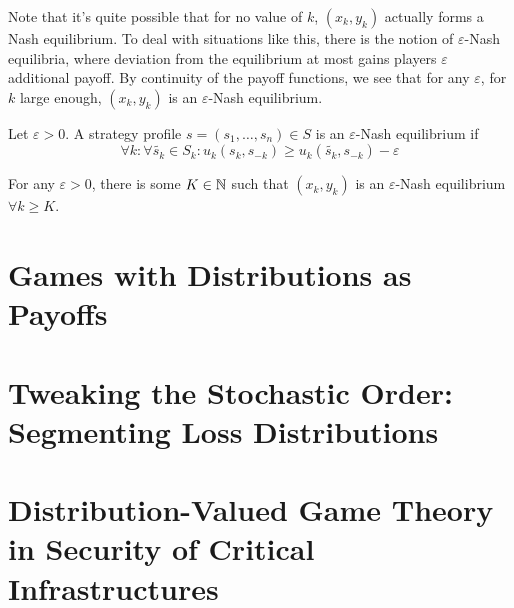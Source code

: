 \documentclass[a4paper]{scrreprt}
\let\epsilon\varepsilon
\begin{document}
    Note that it's quite possible that for no value of $k$, $(x_k, y_k)$ actually forms a Nash equilibrium.
    To deal with situations like this, there is the notion of $\epsilon$-Nash equilibria, where deviation from the equilibrium at most gains players $\epsilon$ additional payoff. %
    By continuity of the payoff functions, we see that for any $\epsilon$, for $k$ large enough, $(x_k, y_k)$ is an $\epsilon$-Nash equilibrium.
    
    \begin{defn}
        Let $\epsilon > 0$.
        A strategy profile $s = (s_1, \dots, s_n) \in S$ is an $\epsilon$-Nash equilibrium if
        \[
            \forall k: \forall \tilde{s_k} \in S_k: u_k(s_k, s_{-k}) \geq u_k(\tilde{s_k}, s_{-k}) - \epsilon
        \]
    \end{defn}

    \begin{cor}
        For any $\epsilon > 0$, there is some $K \in \mathbb{N}$ such that $(x_k, y_k)$ is an $\epsilon$-Nash equilibrium $\forall k \geq K$.
    \end{cor}
    
    
    
    \chapter{Games with Distributions as Payoffs}
    
    
    \chapter{Tweaking the Stochastic Order: Segmenting Loss Distributions}
    
    
    \chapter{Distribution-Valued Game Theory in Security of Critical Infrastructures}
    
\end{document}
